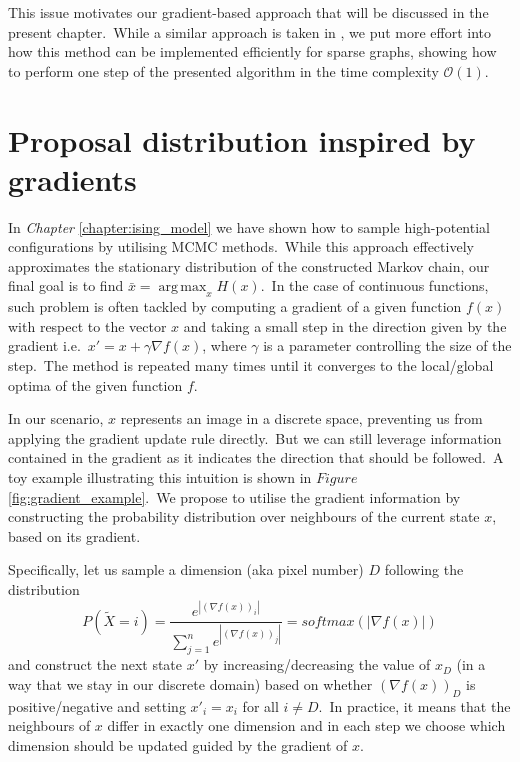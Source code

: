 \documentclass[shortabstract, english, lic]{iithesis}
\DeclareMathOperator*{\argmax}{arg\,max}
\theoremstyle{default_theorem_style}\newtheorem{theorem}{Theorem}
\theoremstyle{default_theorem_style}\newtheorem{definition}{Definition}
\begin{document}
\noindent This issue motivates our gradient-based approach
that will be discussed in the present chapter.\ While a similar approach is taken in \cite{oops_gradient}, we put
more effort into how this method can be implemented efficiently for sparse graphs, showing how to perform one
step of the presented algorithm in the time complexity $\mathcal{O}(1)$.

\section{Proposal distribution inspired by gradients}

In \textit{Chapter} \ref{chapter:ising_model} we have shown how to sample high-potential configurations by
utilising MCMC methods.\ While this approach effectively approximates the stationary distribution of the constructed
Markov chain, our final goal is to find $\bar{x} = \argmax_x H(x)$.\ In the case of continuous functions, such problem
is often tackled by computing a gradient of a given function $f(x)$ with respect to the vector $x$ and taking a small
step in the direction given by the gradient i.e.\ $x' = x + \gamma \nabla f(x)$, where $\gamma$ is a parameter
controlling the size of the step.\ The method is repeated many times until it converges to the local/global optima of
the given function $f$.\newline

\noindent In our scenario, $x$ represents an image in a discrete space, preventing us from applying the gradient update
rule directly.\ But we can still leverage information contained in the gradient as it indicates the direction that
should be followed.\ A toy example illustrating this intuition is shown in $Figure$ \ref{fig:gradient_example}.\ We
propose to utilise the gradient information by constructing the probability distribution over neighbours of the current
state $x$, based on its gradient.\newline\newline

\noindent Specifically, let us sample a dimension (aka pixel number) $D$ following the
distribution
$$
P(\tilde{X} = i) = \frac{e^{|(\nabla f(x))_i|}}{\sum\limits_{j = 1}^{n} e^{|(\nabla f(x))_j|}} =
softmax(|\nabla f(x)|)
$$
and construct the next state $x'$ by increasing/decreasing the value of
$x_D$ (in a way that we stay in our discrete domain) based on whether $(\nabla f(x))_D$ is positive/negative and setting
$x'_i = x_i$ for all $i \neq D$.\ In practice, it means that the neighbours of $x$ differ in exactly one dimension
and in each step we choose which dimension should be updated guided by the gradient of $x$.\newline
\end{document}
